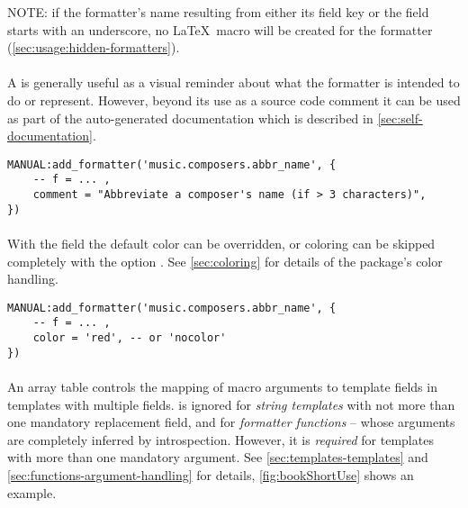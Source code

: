 \documentclass[12pt]{scrartcl}
\begin{document}
NOTE: if the formatter's name resulting from either its field key or the
 field starts with an underscore, no \LaTeX\ macro will be created
for the formatter (\vref{sec:usage:hidden-formatters}).


\paragraph{}

A  is generally useful as a visual reminder about what the
formatter is intended to do or represent.  However, beyond its use as a source
code comment it can be used as part of the auto-generated documentation which is
described in \vref{sec:self-documentation}.

\begin{verbatim}
MANUAL:add_formatter('music.composers.abbr_name', {
	-- f = ... ,
	comment = "Abbreviate a composer's name (if > 3 characters)",
})
\end{verbatim}


\paragraph{}

With the  field the default color can be overridden, or coloring
can be skipped completely with the option .  See
\vref{sec:coloring} for details of the package's color handling.

\begin{verbatim}
MANUAL:add_formatter('music.composers.abbr_name', {
	-- f = ... ,
	color = 'red', -- or 'nocolor'
})
\end{verbatim}


\paragraph{}

An array table  controls the mapping of macro arguments to template
fields in templates with multiple fields.   is ignored for \emph{string templates} with not more than one mandatory replacement field, and for \emph{formatter functions} -- whose arguments are completely inferred by
introspection.  However, it is \emph{required} for templates with more than one mandatory argument.  See \vref{sec:templates-templates} and
\vref{sec:functions-argument-handling} for details, \vref{fig:bookShortUse} shows an example.
\end{document}
